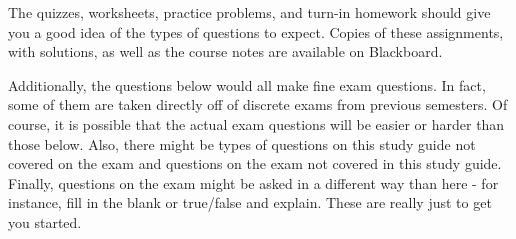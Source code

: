 The quizzes, worksheets, practice problems, and turn-in homework should give you a good idea of the types of questions to expect.  Copies of these assignments, with solutions, as well as the course notes are available on Blackboard.

Additionally, the questions below would all make fine exam questions.  In fact, some of them are taken directly off of discrete exams from previous semesters.  Of course, it is possible that the actual exam questions will be easier or harder than those below.  Also, there might be types of questions on this study guide not covered on the exam and questions on the exam not covered in this study guide.  Finally, questions on the exam might be asked in a different way than here - for instance, fill in the blank or true/false and explain.  These are really just to get you started.  




